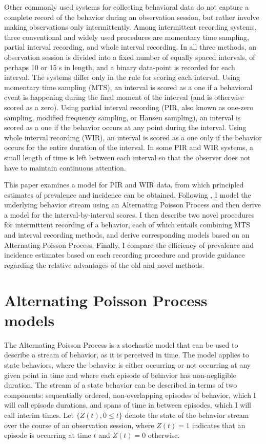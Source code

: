 \documentclass[man, noextraspace, floatsintext]{apa6}\usepackage[]{graphicx}\usepackage[]{color}
\begin{document}
Other commonly used systems for collecting behavioral data do not capture a complete record of the behavior during an observation session, but rather involve making observations only intermittently. 
Among intermittent recording systems, three conventional and widely used procedures are momentary time sampling, partial interval recording, and whole interval recording. 
In all three methods, an observation session is divided into a fixed number of equally spaced intervals, of perhaps 10 or 15 s in length, and a binary data-point is recorded for each interval. 
The systems differ only in the rule for scoring each interval. 
Using momentary time sampling (MTS), an interval is scored as a one if a behavioral event is happening during the final moment of the interval (and is otherwise scored as a zero). 
Using partial interval recording (PIR, also known as one-zero sampling, modified frequency sampling, or Hansen sampling), an interval is scored as a one if the behavior occurs at any point during the interval. 
Using whole interval recording (WIR), an interval is scored as a one only if the behavior occurs for the entire duration of the interval. 
In some PIR and WIR systems, a small length of time is left between each interval so that the observer does not have to maintain continuous attention. 

This paper examines a model for PIR and WIR data, from which principled estimates of prevalence and incidence can be obtained. 
Following \citet{Brown1977estimation}, I model the underlying behavior stream using an Alternating Poisson Process and then derive a model for the interval-by-interval scores. 
I then describe two novel procedures for intermittent recording of a behavior, each of which entails combining MTS and interval recording methods, and derive corresponding models based on an Alternating Poisson Process. 
Finally, I compare the efficiency of prevalence and incidence estimates based on each recording procedure and provide guidance regarding the relative advantages of the old and novel methods.

\section{Alternating Poisson Process models}
\label{sec:APP}

The Alternating Poisson Process is a stochastic model that can be used to describe a stream of behavior, as it is perceived in time. 
The model applies to state behaviors, where the behavior is either occurring or not occurring at any given point in time and where each episode of behavior has non-negligible duration. 
The stream of a state behavior can be described in terms of two components: sequentially ordered, non-overlapping episodes of behavior, which I will call episode durations, and spans of time in between episodes, which I will call interim times. 
Let $\{Z(t), 0 \leq t\}$ denote the state of the behavior stream over the course of an observation session, where $Z(t) = 1$ indicates that an episode is occurring at time $t$ and $Z(t) = 0$ otherwise.
\end{document}
